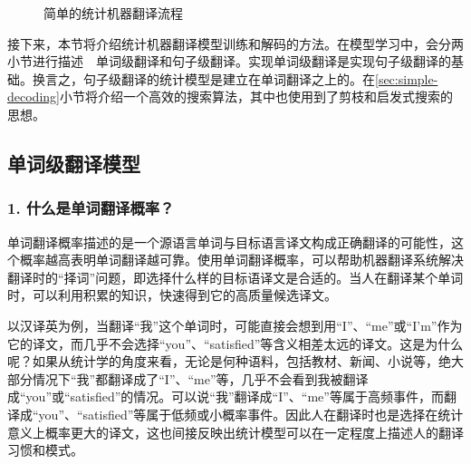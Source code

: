 \begin{figure}[htp]
    \centering

    \caption{简单的统计机器翻译流程}
    \label{fig:5-5}
\end{figure}
\vspace{-0.5em}

\parinterval 接下来，本节将介绍统计机器翻译模型训练和解码的方法。在模型学习中，会分两小节进行描述\ \dash \ 单词级翻译和句子级翻译。实现单词级翻译是实现句子级翻译的基础。换言之，句子级翻译的统计模型是建立在单词翻译之上的。在\ref{sec:simple-decoding}小节将介绍一个高效的搜索算法，其中也使用到了剪枝和启发式搜索的思想。


\subsection{单词级翻译模型}\label{chapter5.2.3}


\subsubsection{1. 什么是单词翻译概率？}

\parinterval 单词翻译概率描述的是一个源语言单词与目标语言译文构成正确翻译的可能性，这个概率越高表明单词翻译越可靠。使用单词翻译概率，可以帮助机器翻译系统解决翻译时的“择词”问题，即选择什么样的目标语译文是合适的。当人在翻译某个单词时，可以利用积累的知识，快速得到它的高质量候选译文。

\parinterval 以汉译英为例，当翻译“我”这个单词时，可能直接会想到用“I”、“me”或“I'm”作为它的译文，而几乎不会选择“you”、“satisfied”等含义相差太远的译文。这是为什么呢？如果从统计学的角度来看，无论是何种语料，包括教材、新闻、小说等，绝大部分情况下“我”都翻译成了“I”、“me”等，几乎不会看到我被翻译成“you”或“satisfied”的情况。可以说“我”翻译成“I”、“me”等属于高频事件，而翻译成“you”、“satisfied”等属于低频或小概率事件。因此人在翻译时也是选择在统计意义上概率更大的译文，这也间接反映出统计模型可以在一定程度上描述人的翻译习惯和模式。

